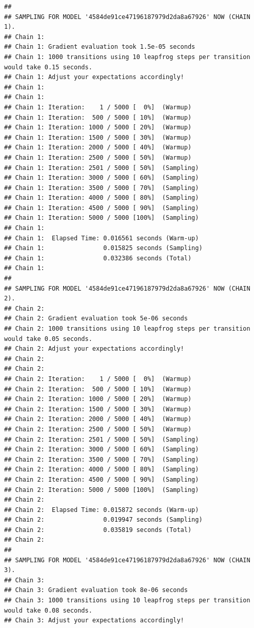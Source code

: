 \documentclass[
  12pt,
]{book}
\theoremstyle{definition}
\theoremstyle{definition}
\theoremstyle{definition}
\theoremstyle{remark}
\begin{document}
\begin{verbatim}
## 
## SAMPLING FOR MODEL '4584de91ce47196187979d2da8a67926' NOW (CHAIN 1).
## Chain 1: 
## Chain 1: Gradient evaluation took 1.5e-05 seconds
## Chain 1: 1000 transitions using 10 leapfrog steps per transition would take 0.15 seconds.
## Chain 1: Adjust your expectations accordingly!
## Chain 1: 
## Chain 1: 
## Chain 1: Iteration:    1 / 5000 [  0%]  (Warmup)
## Chain 1: Iteration:  500 / 5000 [ 10%]  (Warmup)
## Chain 1: Iteration: 1000 / 5000 [ 20%]  (Warmup)
## Chain 1: Iteration: 1500 / 5000 [ 30%]  (Warmup)
## Chain 1: Iteration: 2000 / 5000 [ 40%]  (Warmup)
## Chain 1: Iteration: 2500 / 5000 [ 50%]  (Warmup)
## Chain 1: Iteration: 2501 / 5000 [ 50%]  (Sampling)
## Chain 1: Iteration: 3000 / 5000 [ 60%]  (Sampling)
## Chain 1: Iteration: 3500 / 5000 [ 70%]  (Sampling)
## Chain 1: Iteration: 4000 / 5000 [ 80%]  (Sampling)
## Chain 1: Iteration: 4500 / 5000 [ 90%]  (Sampling)
## Chain 1: Iteration: 5000 / 5000 [100%]  (Sampling)
## Chain 1: 
## Chain 1:  Elapsed Time: 0.016561 seconds (Warm-up)
## Chain 1:                0.015825 seconds (Sampling)
## Chain 1:                0.032386 seconds (Total)
## Chain 1: 
## 
## SAMPLING FOR MODEL '4584de91ce47196187979d2da8a67926' NOW (CHAIN 2).
## Chain 2: 
## Chain 2: Gradient evaluation took 5e-06 seconds
## Chain 2: 1000 transitions using 10 leapfrog steps per transition would take 0.05 seconds.
## Chain 2: Adjust your expectations accordingly!
## Chain 2: 
## Chain 2: 
## Chain 2: Iteration:    1 / 5000 [  0%]  (Warmup)
## Chain 2: Iteration:  500 / 5000 [ 10%]  (Warmup)
## Chain 2: Iteration: 1000 / 5000 [ 20%]  (Warmup)
## Chain 2: Iteration: 1500 / 5000 [ 30%]  (Warmup)
## Chain 2: Iteration: 2000 / 5000 [ 40%]  (Warmup)
## Chain 2: Iteration: 2500 / 5000 [ 50%]  (Warmup)
## Chain 2: Iteration: 2501 / 5000 [ 50%]  (Sampling)
## Chain 2: Iteration: 3000 / 5000 [ 60%]  (Sampling)
## Chain 2: Iteration: 3500 / 5000 [ 70%]  (Sampling)
## Chain 2: Iteration: 4000 / 5000 [ 80%]  (Sampling)
## Chain 2: Iteration: 4500 / 5000 [ 90%]  (Sampling)
## Chain 2: Iteration: 5000 / 5000 [100%]  (Sampling)
## Chain 2: 
## Chain 2:  Elapsed Time: 0.015872 seconds (Warm-up)
## Chain 2:                0.019947 seconds (Sampling)
## Chain 2:                0.035819 seconds (Total)
## Chain 2: 
## 
## SAMPLING FOR MODEL '4584de91ce47196187979d2da8a67926' NOW (CHAIN 3).
## Chain 3: 
## Chain 3: Gradient evaluation took 8e-06 seconds
## Chain 3: 1000 transitions using 10 leapfrog steps per transition would take 0.08 seconds.
## Chain 3: Adjust your expectations accordingly!

\end{verbatim}
\end{document}
